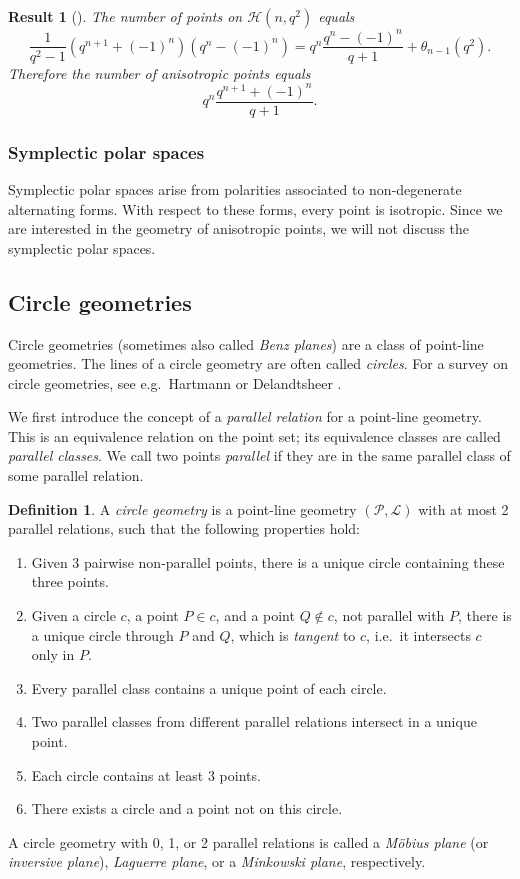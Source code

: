 \documentclass[a4paper]{article}
\newtheorem{res}[thm]{Result}
\theoremstyle{definition}
\newtheorem{df}[thm]{Definition}
\newcommand{\pp}{\mathcal P}
\newcommand{\ml}{\mathcal L}
\newcommand{\mh}{\mathcal H}
\begin{document}
\begin{res}[{\cite[Theorem 2.8]{hirschfeldthas}}]\label{Res:HermitianAnisotropicPoints}
 The number of points on $\mh(n,q^2)$ equals
 \[
  \frac 1 {q^2-1} \left( q^{n+1} + (-1)^n \right) \left( q^n - (-1)^n \right) =  q^n \frac{q^n-(-1)^n}{q+1} + \theta_{n-1}(q^2).
 \]
 Therefore the number of anisotropic points equals
 \[
  q^n \frac{q^{n+1} + (-1)^n}{q+1}.
 \]
\end{res}




\subsubsection{Symplectic polar spaces}

Symplectic polar spaces arise from polarities associated to non-degenerate alternating forms.
With respect to these forms, every point is isotropic.
Since we are interested in the geometry of anisotropic points, we will not discuss the symplectic polar spaces.


\subsection{Circle geometries}

Circle geometries (sometimes also called \emph{Benz planes}) are a class of point-line geometries.
The lines of a circle geometry are often called \emph{circles}.
For a survey on circle geometries, see e.g.\ Hartmann \cite{hartmann} or Delandtsheer \cite[\S 5]{delandtsheer}.

We first introduce the concept of a \emph{parallel relation} for a point-line geometry.
This is an equivalence relation on the point set; its equivalence classes are called \emph{parallel classes}.
We call two points \emph{parallel} if they are in the same parallel class of some parallel relation.

\begin{df}
 A \emph{circle geometry} is a point-line geometry $(\pp,\ml)$ with at most 2 parallel relations, such that the following properties hold:
\begin{enumerate}
 \item Given 3 pairwise non-parallel points, there is a unique circle containing these three points.
 \item Given a circle $c$, a point $P \in c$, and a point $Q \notin c$, not parallel with $P$, there is a unique circle through $P$ and $Q$, which is \emph{tangent} to $c$, i.e.\ it intersects $c$ only in $P$.
 \item Every parallel class contains a unique point of each circle.
 \item Two parallel classes from different parallel relations intersect in a unique point.
 \item Each circle contains at least 3 points.
 \item There exists a circle and a point not on this circle.
\end{enumerate}
A circle geometry with 0, 1, or 2 parallel relations is called a \emph{Möbius plane} (or \emph{inversive plane}), \emph{Laguerre plane}, or a \emph{Minkowski plane}, respectively.
\end{df}
\end{document}

